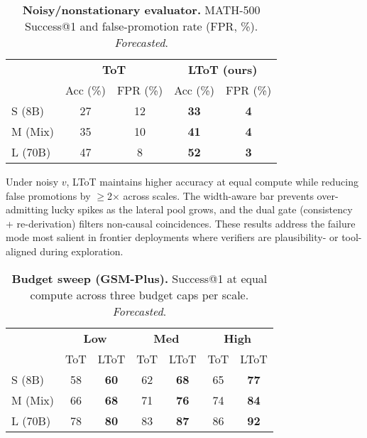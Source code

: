 \documentclass{article}
\begin{document}
\begin{table}[t]
\centering
\caption{\textbf{Noisy/nonstationary evaluator.} MATH-500 Success@1 and false-promotion rate (FPR, \%). \emph{Forecasted}.}
\vspace{0.3em}
\begin{tabular}{lcccc}
\toprule
 & \multicolumn{2}{c}{\textbf{ToT}} & \multicolumn{2}{c}{\textbf{LToT (ours)}} \\
\cmidrule(lr){2-3}\cmidrule(lr){4-5}
 & Acc (\%) & FPR (\%) & Acc (\%) & FPR (\%) \\
\midrule
S (8B)  & 27 & 12 & \textbf{33} & \textbf{4} \\
M (Mix) & 35 & 10 & \textbf{41} & \textbf{4} \\
L (70B) & 47 &  8 & \textbf{52} & \textbf{3} \\
\bottomrule
\end{tabular}
\label{tab:noisy-math}
\end{table}

Under noisy $v$, LToT maintains higher accuracy at equal compute while reducing false promotions by $\ge$2$\times$ across scales.
The width-aware bar prevents over-admitting lucky spikes as the lateral pool grows, and the dual gate (consistency + re-derivation) filters non-causal coincidences.
These results address the failure mode most salient in frontier deployments where verifiers are plausibility- or tool-aligned during exploration.

\begin{table}[t]
\centering
\caption{\textbf{Budget sweep (GSM-Plus).} Success@1 at equal compute across three budget caps per scale. \emph{Forecasted}.}
\vspace{0.3em}
\begin{tabular}{lcccccc}
\toprule
 & \multicolumn{2}{c}{\textbf{Low}} & \multicolumn{2}{c}{\textbf{Med}} & \multicolumn{2}{c}{\textbf{High}} \\
\cmidrule(lr){2-3}\cmidrule(lr){4-5}\cmidrule(lr){6-7}
 & ToT & LToT & ToT & LToT & ToT & LToT \\
\midrule
S (8B)  & 58 & \textbf{60} & 62 & \textbf{68} & 65 & \textbf{77} \\
M (Mix) & 66 & \textbf{68} & 71 & \textbf{76} & 74 & \textbf{84} \\
L (70B) & 78 & \textbf{80} & 83 & \textbf{87} & 86 & \textbf{92} \\
\bottomrule
\end{tabular}
\label{tab:budget-gsm}
\end{table}
\end{document}

